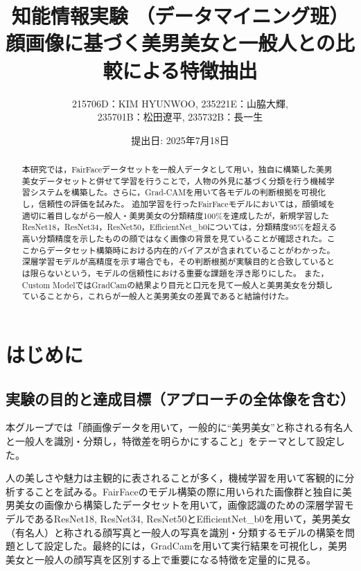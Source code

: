 \documentclass[a4paper,11pt,titlepage]{jsarticle}
\begin{document}
\title{知能情報実験 （データマイニング班） \\ 顔画像に基づく美男美女と一般人との比較による特徴抽出}
\author{215706D：KIM HYUNWOO, 235221E：山脇大輝,\\ 235701B：松田遼平, 235732B：長一生}
\date{提出日: 2025年7月18日}
\maketitle

\tableofcontents
\clearpage

\begin{abstract}
\label{label:abstract}
本研究では，FairFaceデータセットを一般人データとして用い，独自に構築した美男美女データセットと併せて学習を行うことで，人物の外見に基づく分類を行う機械学習システムを構築した。さらに，Grad-CAMを用いて各モデルの判断根拠を可視化し，信頼性の評価を試みた。
追加学習を行ったFairFaceモデルにおいては，顔領域を適切に着目しながら一般人・美男美女の分類精度100\%を達成したが，新規学習したResNet18，ResNet34，ResNet50，EfficientNet_b0については，分類精度95\%を超える高い分類精度を示したものの顔ではなく画像の背景を見ていることが確認された。ここからデータセット構築時における内在的バイアスが含まれていることがわかった。深層学習モデルが高精度を示す場合でも，その判断根拠が実験目的と合致しているとは限らないという，モデルの信頼性における重要な課題を浮き彫りにした。
また，Custom ModelではGradCamの結果より目元と口元を見て一般人と美男美女を分類していることから，これらが一般人と美男美女の差異であると結論付けた。
\end{abstract} 


\section{はじめに}
\label{label:はじめに}
\subsection{実験の目的と達成目標（アプローチの全体像を含む）}
本グループでは「顔画像データを用いて，一般的に“美男美女”と称される有名人と一般人を識別・分類し，特徴差を明らかにすること」をテーマとして設定した。

人の美しさや魅力は主観的に表されることが多く，機械学習を用いて客観的に分析することを試みる。FairFaceのモデル構築の際に用いられた画像群と独自に美男美女の画像から構築したデータセットを用いて，画像認識のための深層学習モデルであるResNet18, ResNet34, ResNet50とEfficientNet\_b0を用いて，美男美女（有名人）と称される顔写真と一般人の写真を識別・分類するモデルの構築を問題として設定した。最終的には，GradCamを用いて実行結果を可視化し，美男美女と一般人の顔写真を区別する上で重要になる特徴を定量的に見る。
\end{document}
